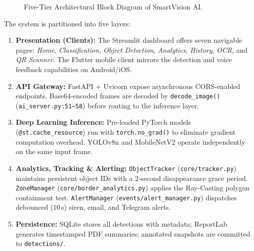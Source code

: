 \documentclass[conference]{IEEEtran}
\begin{document}
\begin{figure}[htbp]
\caption{Five-Tier Architectural Block Diagram of SmartVision AI.}
\label{fig:arch}
\end{figure}

\noindent The system is partitioned into five layers:
\begin{enumerate}
    \item \textbf{Presentation (Clients):} The Streamlit dashboard offers seven
          navigable pages: \textit{Home}, \textit{Classification},
          \textit{Object Detection}, \textit{Analytics}, \textit{History},
          \textit{OCR}, and \textit{QR Scanner}. The Flutter mobile client
          mirrors the detection and voice feedback capabilities on Android/iOS.
    \item \textbf{API Gateway:} FastAPI + Uvicorn expose asynchronous CORS-enabled
          endpoints. Base64-encoded frames are decoded by
          \texttt{decode\_image()} (\texttt{ai\_server.py:51--58}) before
          routing to the inference layer.
    \item \textbf{Deep Learning Inference:} Pre-loaded PyTorch models
          (\texttt{@st.cache\_resource}) run with \texttt{torch.no\_grad()}
          to eliminate gradient computation overhead. YOLOv8n and MobileNetV2
          operate independently on the same input frame.
    \item \textbf{Analytics, Tracking \& Alerting:} \texttt{ObjectTracker}
          (\texttt{core/tracker.py}) maintains persistent object IDs with a
          2-second disappearance grace period. \texttt{ZoneManager}
          (\texttt{core/border\_analytics.py}) applies the Ray-Casting polygon
          containment test. \texttt{AlertManager}
          (\texttt{events/alert\_manager.py}) dispatches debounced (10\,s)
          siren, email, and Telegram alerts.
    \item \textbf{Persistence:} SQLite stores all detections with metadata;
          ReportLab generates timestamped PDF summaries; annotated snapshots
          are committed to \texttt{detections/}.
\end{enumerate}
\end{document}
